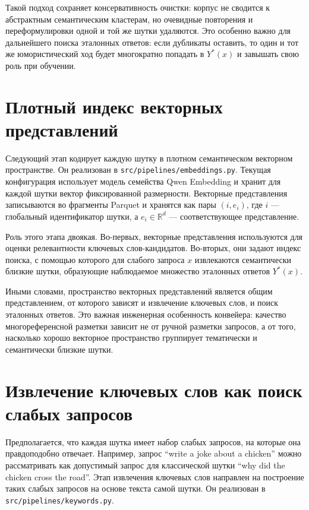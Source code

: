 Такой подход сохраняет консервативность очистки: корпус не сводится к абстрактным семантическим кластерам, но очевидные повторения и переформулировки одной и той же шутки удаляются. Это особенно важно для дальнейшего поиска эталонных ответов: если дубликаты оставить, то один и тот же юмористический ход будет многократно попадать в \(Y^{*}(x)\) и завышать свою роль при обучении.

\section{Плотный индекс векторных представлений}

Следующий этап кодирует каждую шутку в плотном семантическом векторном пространстве. Он реализован в \texttt{src/pipelines/embeddings.py}. Текущая конфигурация использует модель семейства Qwen Embedding и хранит для каждой шутки вектор фиксированной размерности. Векторные представления записываются во фрагменты Parquet и хранятся как пары \((i,e_i)\), где \(i\) --- глобальный идентификатор шутки, а \(e_i\in\mathbb{R}^{d}\) --- соответствующее представление.

Роль этого этапа двоякая. Во-первых, векторные представления используются для оценки релевантности ключевых слов-кандидатов. Во-вторых, они задают индекс поиска, с помощью которого для слабого запроса \(x\) извлекаются семантически близкие шутки, образующие наблюдаемое множество эталонных ответов \(Y^{*}(x)\).

Иными словами, пространство векторных представлений является общим представлением, от которого зависят и извлечение ключевых слов, и поиск эталонных ответов. Это важная инженерная особенность конвейера: качество многореференсной разметки зависит не от ручной разметки запросов, а от того, насколько хорошо векторное пространство группирует тематически и семантически близкие шутки.

\section{Извлечение ключевых слов как поиск слабых запросов}

Предполагается, что каждая шутка имеет набор слабых запросов, на которые она правдоподобно отвечает. Например, запрос ``write a joke about a chicken'' можно рассматривать как допустимый запрос для классической шутки ``why did the chicken cross the road''. Этап извлечения ключевых слов направлен на построение таких слабых запросов на основе текста самой шутки. Он реализован в \texttt{src/pipelines/keywords.py}.

